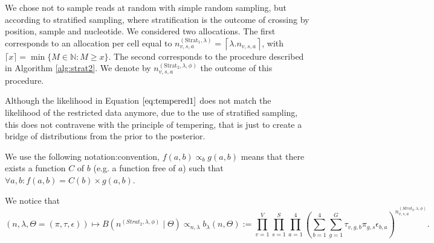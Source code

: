 \documentclass{article}
\begin{document}
We chose not  to sample reads at random with simple random sampling, but according to stratified sampling, where stratification is the outcome of crossing by position, sample and nucleotide.
We considered two allocations. The first corresponds to an allocation per cell equal to $n_{v,s,a}^{(\mathrm{Strat}_1,\lambda)}=\left\lceil \lambda. n_{v,s,a}\right\rceil$, 
with $\lceil x\rceil=\min\{M\in\mathbb{N} : M\geq x\}$. 
The second corresponds to the procedure described in Algorithm \ref{alg:strat2}.
We denote by $n_{v,s,a}^{(\mathrm{Strat}_2,\lambda,\phi)}$ the outcome of this procedure.

Although the likelihood in Equation $\ref{eq:tempered1}$ does not match the likelihood of the restricted data anymore, due to the use of stratified sampling, this does not contravene with the principle of tempering, that is just to create a bridge of distributions from the prior to the posterior. 


We use the following notation:convention, $f(a, b)\propto_b g(a,b)$ means that there exists a function $C$ of $b$ (e.g. a function free of $a$) such that $\forall a,b: f(a,b)=C(b)\times g(a,b)$.

We notice that $$(n,\lambda,\Theta=(\pi, \tau,\epsilon))\mapsto B\left(n^{(Strat_2,\lambda,\phi)}\mid\Theta\right) \propto_{n,\lambda} b_\lambda(n,\Theta):= \prod_{v=1}^{V} \prod_{s = 1}^{S} \prod_{a = 1}^{4} \left(\sum_{b=1}^{4} \sum_{g = 1}^{G} \tau_{v,g,b} \pi_{g,s} \epsilon_{b,a} \right)^{n_{v,s,a}^{(Strat_2,\lambda,\phi)}}.$$
\end{document}
